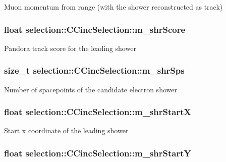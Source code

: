 Muon momentum from range (with the shower reconstructed as track) \hypertarget{classselection_1_1CCincSelection_a4674f9b827098184a3daba78da7048a9}{
\subsubsection[{m\-\_\-shr\-Score}]{\setlength{\rightskip}{0pt plus 5cm}float selection\-::\-C\-Cinc\-Selection\-::m\-\_\-shr\-Score\hspace{0.3cm}{\ttfamily [private]}}}\label{classselection_1_1CCincSelection_a4674f9b827098184a3daba78da7048a9}
Pandora track score for the leading shower \hypertarget{classselection_1_1CCincSelection_a4694bec595cce8e01abc186d9c34e079}{
\subsubsection[{m\-\_\-shr\-Sps}]{\setlength{\rightskip}{0pt plus 5cm}size\-\_\-t selection\-::\-C\-Cinc\-Selection\-::m\-\_\-shr\-Sps\hspace{0.3cm}{\ttfamily [private]}}}\label{classselection_1_1CCincSelection_a4694bec595cce8e01abc186d9c34e079}
Number of spacepoints of the candidate electron shower \hypertarget{classselection_1_1CCincSelection_a692099d6cabdf30bfd269f35c3193971}{
\subsubsection[{m\-\_\-shr\-Start\-X}]{\setlength{\rightskip}{0pt plus 5cm}float selection\-::\-C\-Cinc\-Selection\-::m\-\_\-shr\-Start\-X\hspace{0.3cm}{\ttfamily [private]}}}\label{classselection_1_1CCincSelection_a692099d6cabdf30bfd269f35c3193971}
Start x coordinate of the leading shower \hypertarget{classselection_1_1CCincSelection_a60b711d11ef5b1ce99992df868e900c7}{
\subsubsection[{m\-\_\-shr\-Start\-Y}]{\setlength{\rightskip}{0pt plus 5cm}float selection\-::\-C\-Cinc\-Selection\-::m\-\_\-shr\-Start\-Y\hspace{0.3cm}{\ttfamily [private]}}}\label{classselection_1_1CCincSelection_a60b711d11ef5b1ce99992df868e900c7}
